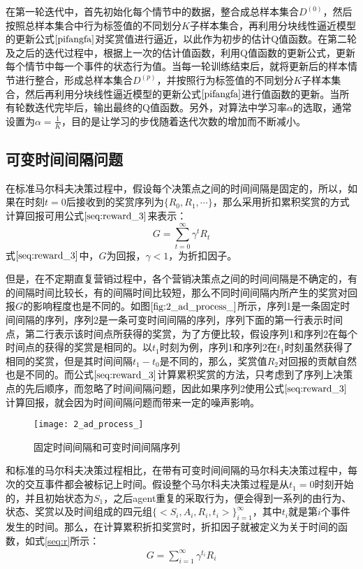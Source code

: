 在第一轮迭代中，首先初始化每个情节中的数据，整合成总样本集合$D^{(0)}$，然后按照总样本集合中行为标签值的不同划分$K$子样本集合，再利用分块线性逼近模型的更新公式$\eqref{pifangfa}$对奖赏值进行逼近，以此作为初步的估计Q值函数。在第二轮及之后的迭代过程中，根据上一次的估计值函数，利用Q值函数的更新公式，更新每个情节中每一个事件的状态行为值。当每一轮训练结束后，就将更新后的样本情节进行整合，形成总样本集合$D^{(p)}$，并按照行为标签值的不同划分$K$子样本集合，然后再利用分块线性逼近模型的更新公式$\eqref{pifangfa}$进行值函数的更新。当所有轮数迭代完毕后，输出最终的Q值函数。另外，对算法中学习率$\alpha$的选取，通常设置为$\alpha=\frac{1}{K}$，目的是让学习的步伐随着迭代次数的增加而不断减小。

\subsection{可变时间间隔问题}
在标准马尔科夫决策过程中，假设每个决策点之间的时间间隔是固定的，所以，如果在时刻$t=0$后接收到的奖赏序列为$\{R_{0}, R_{1},\cdots\}$，那么采用折扣累积奖赏的方式计算回报可用公式$\eqref{seq:reward_3}$来表示：
\begin{equation}\label{seq:reward_3}
G=\sum_{t=0}^{\infty}\gamma^{t}R_{t}
\end{equation}
式$\eqref{seq:reward_3}$中，$G$为回报，$\gamma<1$，为折扣因子。

但是，在不定期直复营销过程中，各个营销决策点之间的时间间隔是不确定的，有的间隔时间比较长，有的间隔时间比较短，那么不同时间间隔内所产生的奖赏对回报$G$的影响程度也是不同的。如图$\ref{fig:2_ad_process_}$所示，序列1是一条固定时间间隔的序列，序列2是一条可变时间间隔的序列，序列下面的第一行表示时间点，第二行表示该时间点所获得的奖赏，为了方便比较，假设序列1和序列2在每个时间点的获得的奖赏是相同的。以$t_{1}$时刻为例，序列1和序列2在$t_{1}$时刻虽然获得了相同的奖赏，但是其时间间隔$t_{1}-t_{0}$是不同的，那么，奖赏值$R_{2}$对回报的贡献自然也是不同的。而公式$\eqref{seq:reward_3}$计算累积奖赏的方法，只考虑到了序列上决策点的先后顺序，而忽略了时间间隔问题，因此如果序列2使用公式$\eqref{seq:reward_3}$计算回报，就会因为时间间隔问题而带来一定的噪声影响。
\begin{figure}[htbp]
\centering
\texttt{[image: 2\_ad\_process\_]}
\caption{固定时间间隔和可变时间间隔序列}
\label{fig:2_ad_process_}
\end{figure}

和标准的马尔科夫决策过程相比，在带有可变时间间隔的马尔科夫决策过程中，每次的交互事件都会被标记上时间。假设整个马尔科夫决策过程是从$t_{1}=0$时刻开始的，并且初始状态为$S_{1}$，之后agent重复的采取行为，便会得到一系列的由行为、状态、奖赏以及时间组成的四元组$\{<S_{i},A_{i},R_{i},t_{i}>\}_{i=1}^{\infty}$，其中$t_{i}$就是第$i$个事件发生的时间。那么，在计算累积折扣奖赏时，折扣因子就被定义为关于时间的函数，如式\eqref{seq:r}所示：
\begin{equation}\label{seq:r}
\begin{aligned}
G=\sum_{i=1}^{\infty} \gamma^{t_{i}}R_{i}
\end{aligned}
\end{equation}

